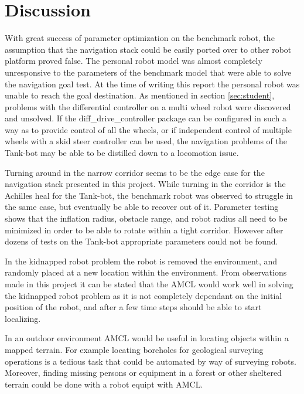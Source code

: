 \documentclass[10pt,journal,compsoc]{IEEEtran}
\begin{document}
\section{Discussion}

With great success of parameter optimization on the benchmark robot, the assumption that the navigation stack could be easily ported over to other robot platform proved false. The personal robot model was almost completely unresponsive to the parameters of the benchmark model that were able to solve the navigation goal test. At the time of writing this report the personal robot was unable to reach the goal destination. As mentioned in section \ref{sec:student}, problems with the differential controller on a multi wheel robot were discovered and unsolved. If the diff\_drive\_controller package can be configured in such a way as to provide control of all the wheels, or if independent control of multiple wheels with a skid steer controller can be used, the navigation problems of the Tank-bot may be able to be distilled down to a locomotion issue.

Turning around in the narrow corridor seems to be the edge case for the navigation stack presented in this project. While turning in the corridor is the Achilles heal for the Tank-bot, the benchmark robot was observed to struggle in the same case, but eventually be able to recover out of it. Parameter testing shows that the inflation radius, obstacle range, and robot radius all need to be minimized in order to be able to rotate within a tight corridor. However after dozens of tests on the Tank-bot appropriate parameters could not be found.

In the kidnapped robot problem the robot is removed the environment, and randomly placed at a new location within the environment. From observations made in this project it can be stated that the AMCL would work well in solving the kidnapped robot problem as it is not completely dependant on the initial position of the robot, and after a few time steps should be able to start localizing.

In an outdoor environment AMCL would be useful in locating objects within a mapped terrain. For example locating boreholes for geological surveying operations is a tedious task that could be automated by way of surveying robots. Moreover, finding missing persons or equipment in a forest or other sheltered terrain could be done with a robot equipt with AMCL.
\end{document}
